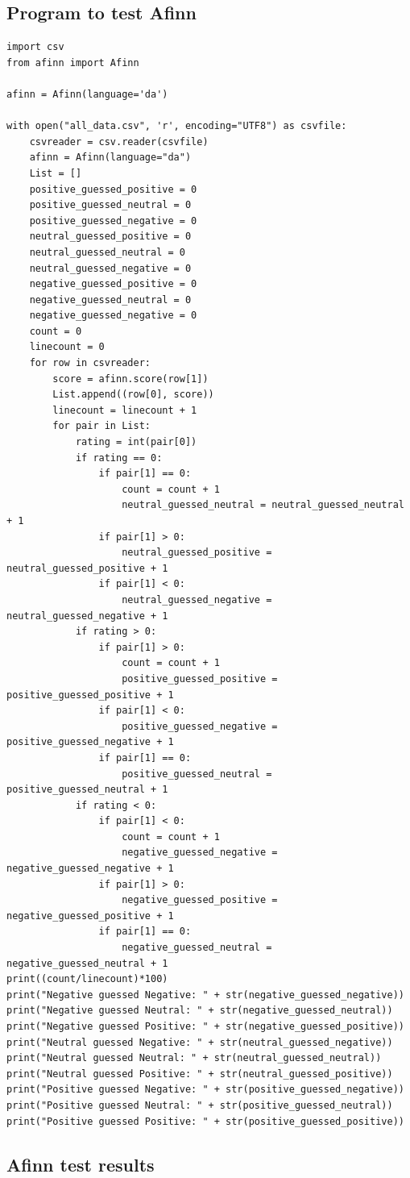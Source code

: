 \subsection{Program to test Afinn}
\begin{verbatim}
import csv
from afinn import Afinn

afinn = Afinn(language='da')

with open("all_data.csv", 'r', encoding="UTF8") as csvfile:
	csvreader = csv.reader(csvfile)
	afinn = Afinn(language="da")
	List = []
	positive_guessed_positive = 0
	positive_guessed_neutral = 0
	positive_guessed_negative = 0
	neutral_guessed_positive = 0
	neutral_guessed_neutral = 0
	neutral_guessed_negative = 0
	negative_guessed_positive = 0
	negative_guessed_neutral = 0
	negative_guessed_negative = 0
	count = 0
	linecount = 0
	for row in csvreader:
		score = afinn.score(row[1])
		List.append((row[0], score))
		linecount = linecount + 1
		for pair in List:
			rating = int(pair[0])
			if rating == 0:
				if pair[1] == 0:
					count = count + 1
					neutral_guessed_neutral = neutral_guessed_neutral + 1
				if pair[1] > 0:
					neutral_guessed_positive = neutral_guessed_positive + 1
				if pair[1] < 0:
					neutral_guessed_negative = neutral_guessed_negative + 1
			if rating > 0:
				if pair[1] > 0:
					count = count + 1
					positive_guessed_positive = positive_guessed_positive + 1
				if pair[1] < 0:
					positive_guessed_negative = positive_guessed_negative + 1
				if pair[1] == 0:
					positive_guessed_neutral = positive_guessed_neutral + 1
			if rating < 0:
				if pair[1] < 0:
					count = count + 1
					negative_guessed_negative = negative_guessed_negative + 1
				if pair[1] > 0:
					negative_guessed_positive = negative_guessed_positive + 1
				if pair[1] == 0:
					negative_guessed_neutral = negative_guessed_neutral + 1
print((count/linecount)*100)
print("Negative guessed Negative: " + str(negative_guessed_negative))
print("Negative guessed Neutral: " + str(negative_guessed_neutral))
print("Negative guessed Positive: " + str(negative_guessed_positive))
print("Neutral guessed Negative: " + str(neutral_guessed_negative))
print("Neutral guessed Neutral: " + str(neutral_guessed_neutral))
print("Neutral guessed Positive: " + str(neutral_guessed_positive))
print("Positive guessed Negative: " + str(positive_guessed_negative))
print("Positive guessed Neutral: " + str(positive_guessed_neutral))
print("Positive guessed Positive: " + str(positive_guessed_positive))
\end{verbatim}

\subsection{Afinn test results}

